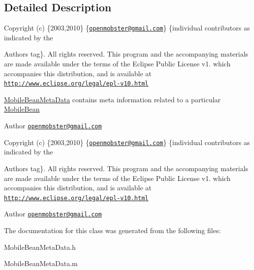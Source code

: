 \subsection{\-Detailed \-Description}
\-Copyright (c) \{2003,2010\} \{\href{mailto:openmobster@gmail.com}{\tt openmobster@gmail.\-com}\} \{individual contributors as indicated by the \begin{DoxyAuthor}{\-Authors}
tag\}. \-All rights reserved. \-This program and the accompanying materials are made available under the terms of the \-Eclipse \-Public \-License v1. which accompanies this distribution, and is available at \href{http://www.eclipse.org/legal/epl-v10.html}{\tt http\-://www.\-eclipse.\-org/legal/epl-\/v10.\-html}
\end{DoxyAuthor}
\hyperlink{interface_mobile_bean_meta_data}{\-Mobile\-Bean\-Meta\-Data} contains meta information related to a particular \hyperlink{interface_mobile_bean}{\-Mobile\-Bean}

\begin{DoxyAuthor}{\-Author}
\href{mailto:openmobster@gmail.com}{\tt openmobster@gmail.\-com}
\end{DoxyAuthor}
\-Copyright (c) \{2003,2010\} \{\href{mailto:openmobster@gmail.com}{\tt openmobster@gmail.\-com}\} \{individual contributors as indicated by the \begin{DoxyAuthor}{\-Authors}
tag\}. \-All rights reserved. \-This program and the accompanying materials are made available under the terms of the \-Eclipse \-Public \-License v1. which accompanies this distribution, and is available at \href{http://www.eclipse.org/legal/epl-v10.html}{\tt http\-://www.\-eclipse.\-org/legal/epl-\/v10.\-html}
\end{DoxyAuthor}
\begin{DoxyAuthor}{\-Author}
\href{mailto:openmobster@gmail.com}{\tt openmobster@gmail.\-com} 
\end{DoxyAuthor}


\-The documentation for this class was generated from the following files\-:\begin{DoxyCompactItemize}
\item 
\-Mobile\-Bean\-Meta\-Data.\-h\item 
\-Mobile\-Bean\-Meta\-Data.\-m\end{DoxyCompactItemize}
